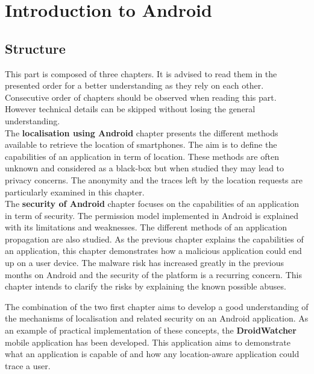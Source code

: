 
\chapter{Introduction to Android}
\label{chap:andro-intro}

\section*{Structure}
\label{sec:intro-andro-structure}
This part is composed of three chapters.
It is advised to read them in the presented order for a better understanding as they rely on each other. %
Consecutive order of chapters should be observed when reading this part.
However technical details can be skipped without losing the general understanding.\\

The \textbf{localisation using Android} chapter presents the different methods available to retrieve the location of smartphones.
The aim is to define the capabilities of an application in term of location.
These methods are often unknown and considered as a black-box but when studied they may lead to privacy concerns.
The anonymity and the traces left by the location requests are particularly examined in this chapter.\\

The \textbf{security of Android} chapter focuses on the capabilities of an application in term of security.
The permission model implemented in Android is explained with its limitations and weaknesses.
The different methods of an application propagation are also studied.
As the previous chapter explains the capabilities of an application, this chapter demonstrates how a malicious application could end up on a user device.
The malware risk has increased greatly in the previous months on Android and the security of the platform is a recurring concern.
This chapter intends to clarify the risks by explaining the known possible abuses.

The combination of the two first chapter aims to develop a good understanding of the mechanisms of localisation and related security on an Android application.
As an example of practical implementation of these concepts, the \textbf{DroidWatcher} mobile application has been developed.
This application aims to demonstrate what an application is capable of and how any location-aware application could trace a user.

